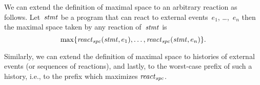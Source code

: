 We can extend the definition of maximal space to an arbitrary reaction as
follows.  Let~$\mathit{stmt}$ be a program that can react to external events~$e_1$,
\dots,~$e_n$ then the maximal space taken by any reaction of~$\mathit{stmt}$ is
\[
  \max\{\operatorname{\mathit{react}}\nolimits_\mathit{spc}(\mathit{stmt},e_1),\dots,\operatorname{\mathit{react}}\nolimits_\mathit{spc}(\mathit{stmt},e_n)\}.
\]

Similarly, we can extend the definition of maximal space to histories of
external events (or sequences of reactions), and lastly, to the worst-case
prefix of such a history, i.e., to the prefix which maximizes $\operatorname{\mathit{react}}\nolimits_\mathit{spc}$.





